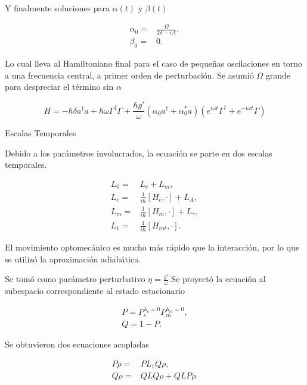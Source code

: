 \documentclass[10pt]{beamer}
\begin{document}
\begin{frame}
Y finalmente soluciones para $\alpha(t)$ y $\beta(t)$

\begin{align*}
\alpha_0 =& \frac{\Omega}{2\delta-iA},\\
\beta_0 =& 0.
\end{align*}

Lo cual lleva al Hamiltoniano final para el caso de pequeñas oscilaciones en torno a una frecuencia central, a primer orden de perturbación. Se asumió $\Omega$ grande para despreciar el término sin $\alpha$ 

\begin{equation*}
H = -\hbar \delta a^{\dagger}a +\hbar\omega\Gamma^{\dagger}\Gamma +\frac{\hbar g'}{\omega}(\alpha_0 a^{\dagger}+\alpha^*_0 a)(e^{i\omega t}\Gamma^{\dagger}+e^{-i\omega t}\Gamma)
\end{equation*}
\end{frame}

\begin{frame}{Escalas Temporales}

Debido a los parámetros involucrados, la ecuación se parte en dos escalas temporales. 

\begin{align*}
L_0 =& L_c + L_m,\\
L_c =& \frac{1}{i\hbar}[H_c,\cdot] + L_A,\\
L_m =& \frac{1}{i\hbar}[H_m,\cdot] + L_\gamma,\\
L_1 =& \frac{1}{i\hbar}[H_{int},\cdot].
\end{align*}

El movimiento optomecánico es mucho más rápido que la interacción, por lo que se utilizó la aproximación adiabática.


\end{frame}

\begin{frame}
Se tomó como parámetro perturbativo $\eta=\frac{g'}{\omega}$.Se proyectó la ecuación al subespacio correspondiente al estado estacionario

\begin{align*}
P = P_c^{\lambda_c = 0}P_m^{\lambda_m = 0},\\
Q = 1 - P.
\end{align*}

Se obtuvieron dos ecuaciones acopladas

\begin{align*}
P\dot{\rho}=& PL_1Q\rho, \\
Q\dot{\rho}=& QLQ\rho + QLP\rho.
\end{align*}
\end{frame}
\end{document}

